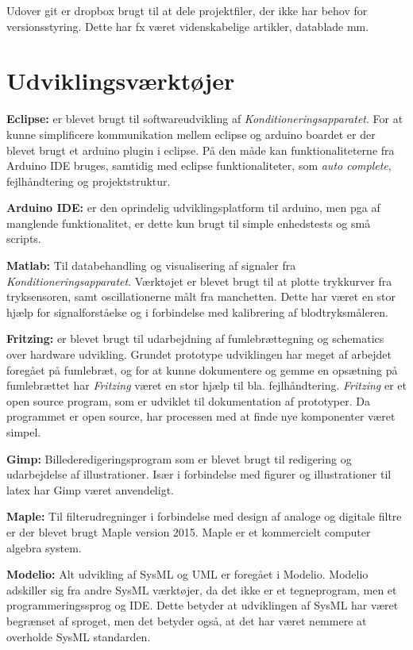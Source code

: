 Udover git er dropbox brugt til at dele projektfiler, der ikke har behov for versionsstyring. Dette har fx været videnskabelige artikler, datablade mm. 

\section{Udviklingsværktøjer}\label{title:udviklingsvaerktoejer}
\textbf{Eclipse:} er blevet brugt til softwareudvikling af \textit{Konditioneringsapparatet}. For at kunne simplificere kommunikation mellem eclipse og arduino boardet er der blevet brugt et arduino plugin i eclipse. På den måde kan funktionaliteterne fra Arduino IDE bruges, samtidig med  eclipse funktionaliteter, som \textit{auto complete}, fejlhåndtering og projektstruktur. 

\textbf{Arduino IDE:} er den oprindelig udviklingsplatform til arduino, men pga af manglende funktionalitet, er dette kun brugt til simple enhedstests og små scripts. 

\textbf{Matlab:} Til databehandling og visualisering af signaler fra \textit{Konditioneringsapparatet}. Værktøjet er blevet brugt til at plotte trykkurver fra tryksensoren, samt oscillationerne målt fra manchetten. Dette har været en stor hjælp for signalforståelse og i forbindelse med kalibrering af blodtryksmåleren. 

\textbf{Fritzing:} er blevet brugt til udarbejdning af fumlebrættegning og schematics over hardware udvikling. Grundet prototype udviklingen har meget af arbejdet foregået på fumlebræt, og for at kunne dokumentere og \textquotedbl gemme\textquotedbl{} en opsætning på fumlebrættet har \textit{Fritzing} været en stor hjælp til bla. fejlhåndtering. \textit{Fritzing} er et open source program, som er udviklet til dokumentation af prototyper. Da programmet er open source, har processen med at finde nye komponenter været simpel. 

\textbf{Gimp:} Billederedigeringsprogram som er blevet brugt til redigering og udarbejdelse af illustrationer. Især i forbindelse med figurer og illustrationer til latex har Gimp været anvendeligt. 

\textbf{Maple:} Til filterudregninger i forbindelse med design af analoge og digitale filtre er der blevet brugt Maple version 2015. Maple er et kommercielt computer algebra system. 

\textbf{Modelio:} Alt udvikling af SysML og UML er foregået i Modelio. Modelio adskiller sig fra andre SysML værktøjer, da det ikke er et tegneprogram, men et programmeringssprog og IDE. Dette betyder at udviklingen af SysML har været begrænset af sproget, men det betyder også, at det har været nemmere at overholde SysML standarden. 

